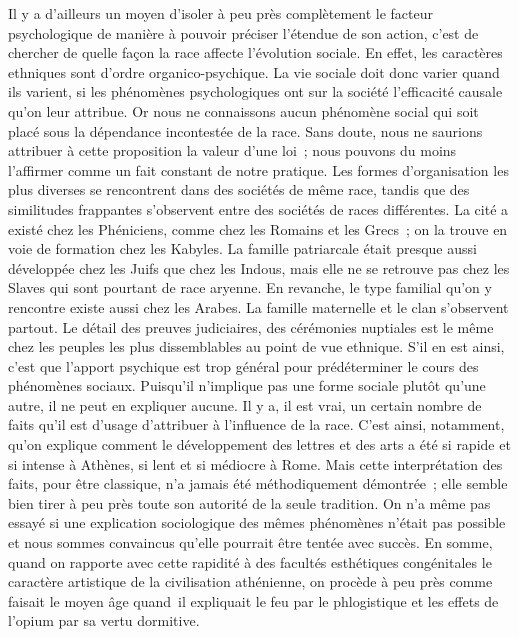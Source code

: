 \documentclass[french,twoside]{book} %
\begin{document}
Il y a d’ailleurs un moyen d’isoler à peu près complètement le facteur psychologique de manière à pouvoir préciser l’étendue de son action, c’est de chercher de quelle façon la race affecte l’évolution sociale. En effet, les caractères ethniques sont d’ordre organico-psychique. La vie sociale doit donc varier quand ils varient, si les phénomènes psychologiques ont sur la société l’efficacité causale qu’on leur attribue. Or nous ne connaissons aucun phénomène social qui soit placé sous la dépendance incontestée de la race. Sans doute, nous ne saurions attribuer à cette proposition la valeur d’une loi ; nous pouvons du moins l’affirmer comme un fait constant de notre pratique. Les formes d’organisation les plus diverses se rencontrent dans des sociétés de même race, tandis que des similitudes frappantes s’observent entre des sociétés de races différentes. La cité a existé chez les Phéniciens, comme chez les Romains et les Grecs ; on la trouve en voie de formation chez les Kabyles. La famille patriarcale était presque aussi développée chez les Juifs que chez les Indous, mais elle ne se retrouve pas chez les Slaves qui sont pourtant de race aryenne. En revanche, le type familial qu’on y rencontre existe aussi chez les Arabes. La famille maternelle et le clan s’observent partout. Le détail des preuves judiciaires, des cérémonies nuptiales est le même chez les peuples les plus dissemblables au point de vue ethnique. S’il en est ainsi, c’est que l’apport psychique est trop général pour prédéterminer le cours des phénomènes sociaux. Puisqu’il n’implique pas une forme sociale plutôt qu’une autre, il ne peut en expliquer aucune. Il y a, il est vrai, un certain nombre de faits qu’il est d’usage d’attribuer à l’influence de la race. C’est ainsi, notamment, qu’on explique comment le développement des lettres et des arts a été si rapide et si intense à Athènes, si lent et si médiocre à Rome. Mais cette interprétation des faits, pour être classique, n’a jamais été méthodiquement démontrée ; elle semble bien tirer à peu près toute son autorité de la seule tradition. On n’a même pas essayé si une explication sociologique des mêmes phénomènes n’était pas possible et nous sommes convaincus qu’elle pourrait être tentée avec succès. En somme, quand on rapporte avec cette rapidité à des facultés esthétiques congénitales le caractère artistique de la civilisation athénienne, on procède à peu près comme faisait le moyen âge quand il expliquait le feu par le phlogistique et les effets de l’opium par sa vertu dormitive.\par
\end{document}
